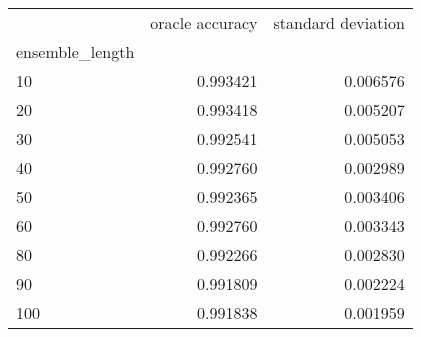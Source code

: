 \begin{tabular}{lrr}
\toprule
{} &  oracle accuracy &  standard deviation \\
ensemble\_length &                  &                     \\
\midrule
10              &         0.993421 &            0.006576 \\
20              &         0.993418 &            0.005207 \\
30              &         0.992541 &            0.005053 \\
40              &         0.992760 &            0.002989 \\
50              &         0.992365 &            0.003406 \\
60              &         0.992760 &            0.003343 \\
80              &         0.992266 &            0.002830 \\
90              &         0.991809 &            0.002224 \\
100             &         0.991838 &            0.001959 \\
\bottomrule
\end{tabular}
